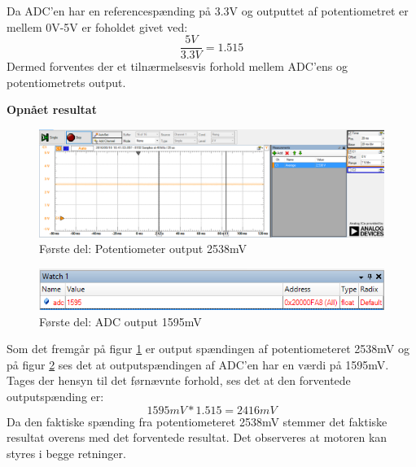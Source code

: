 \noindent Da ADC'en har en referencespænding på 3.3V og outputtet af potentiometret er mellem 0V-5V er foholdet givet ved:
\begin{equation}
\frac {5V} {3.3V}= 1.515
\end{equation}
Dermed forventes der et tilnærmelsesvis forhold mellem ADC'ens og potentiometrets output. \newline

\noindent \textbf{Opnået resultat}
\begin{figure}[H]
	\centering
	\includegraphics[width=\textwidth]{test/images/ModultestADC/2538Vanalog}
	\caption{Første del: Potentiometer output 2538mV}
	\label{figure:analogmid}
\end{figure}
\begin{figure}[H]
	\centering
	\includegraphics[width=\textwidth]{test/images/ModultestADC/mellemDebug}
	\caption{Første del: ADC output 1595mV}
	\label{figure: ADCmid}
\end{figure}

\noindent Som det fremgår på figur \ref{figure:analogmid} er output spændingen af potentiometeret 2538mV og på figur \ref{figure: ADCmid} ses det at outputspændingen af ADC’en har en værdi på 1595mV. Tages der hensyn til det førnævnte forhold, ses det at den forventede outputspænding er:
\begin{equation}
1595mV * 1.515 = 2416mV
\end{equation}
Da den faktiske spænding fra potentiometeret 2538mV stemmer det faktiske resultat overens med det forventede resultat. Det observeres at motoren kan styres i begge retninger.


